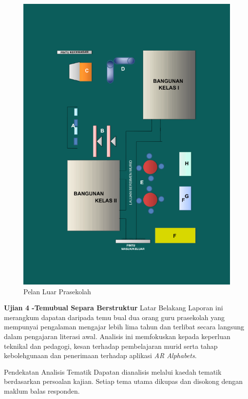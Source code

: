{{\begin{figure}
    \centering
    \includegraphics[width=1\linewidth]{Pelan-Lantai-Kelas-Prasekolah-20250630095727.pdf (5 x 6.8 cm)-2.png}
    \caption{Pelan Luar Prasekolah }
    \label{fig:enter-label}
\end{figure}
\clearpage

\textbf{Ujian  4 -Temubual Separa Berstruktur}
\vspace{0.5cm}
{Latar Belakang}
Laporan ini merangkum dapatan daripada temu bual dua orang guru prasekolah yang mempunyai pengalaman mengajar lebih lima tahun dan terlibat secara langsung dalam pengajaran literasi awal. Analisis ini memfokuskan kepada keperluan teknikal dan pedagogi, kesan terhadap pembelajaran murid serta tahap kebolehgunaan dan penerimaan terhadap aplikasi \textit{AR Alphabets}.

\vspace{0.3cm}
{Pendekatan Analisis Tematik}
Dapatan dianalisis melalui kaedah tematik berdasarkan persoalan kajian. Setiap tema utama dikupas dan disokong dengan maklum balas responden.

}}
